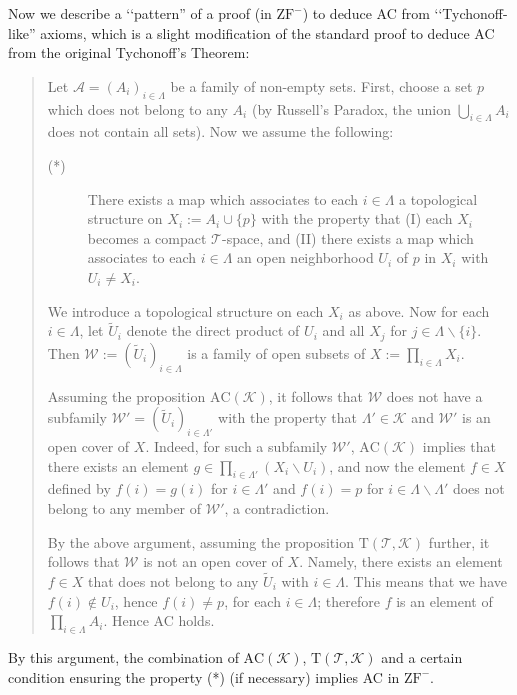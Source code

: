 \documentclass{article}
\begin{document}
Now we describe a \lq\lq pattern'' of a proof (in $\mathrm{ZF}^-$) to deduce AC from \lq\lq Tychonoff-like'' axioms, which is a slight modification of the standard proof to deduce AC from the original Tychonoff's Theorem:
\begin{quotation}
Let $\mathcal{A} = (A_i)_{i \in \Lambda}$ be a family of non-empty sets.
First, choose a set $p$ which does not belong to any $A_i$ (by Russell's Paradox, the union $\bigcup_{i \in \Lambda} A_i$ does not contain all sets).
Now we assume the following:
\begin{description}
\item[(*)] There exists a map which associates to each $i \in \Lambda$ a topological structure on $X_i := A_i \cup \{p\}$ with the property that (I) each $X_i$ becomes a compact $\mathcal{T}$-space, and (II) there exists a map which associates to each $i \in \Lambda$ an open neighborhood $U_i$ of $p$ in $X_i$ with $U_i \neq X_i$.
\end{description}
We introduce a topological structure on each $X_i$ as above.
Now for each $i \in \Lambda$, let $\widetilde{U}_i$ denote the direct product of $U_i$ and all $X_j$ for $j \in \Lambda \smallsetminus \{i\}$.
Then $\mathcal{W} := (\widetilde{U}_i)_{i \in \Lambda}$ is a family of open subsets of $X := \prod_{i \in \Lambda} X_i$.

Assuming the proposition $\mathrm{AC}(\mathcal{K})$, it follows that $\mathcal{W}$ does not have a subfamily $\mathcal{W}' = (\widetilde{U}_i)_{i \in \Lambda'}$ with the property that $\Lambda' \in \mathcal{K}$ and $\mathcal{W}'$ is an open cover of $X$.
Indeed, for such a subfamily $\mathcal{W}'$, $\mathrm{AC}(\mathcal{K})$ implies that there exists an element $g \in \prod_{i \in \Lambda'} (X_i \smallsetminus U_i)$, and now the element $f \in X$ defined by $f(i) = g(i)$ for $i \in \Lambda'$ and $f(i) = p$ for $i \in \Lambda \smallsetminus \Lambda'$ does not belong to any member of $\mathcal{W}'$, a contradiction.

By the above argument, assuming the proposition $\mathrm{T}(\mathcal{T},\mathcal{K})$ further, it follows that $\mathcal{W}$ is not an open cover of $X$.
Namely, there exists an element $f \in X$ that does not belong to any $\widetilde{U}_i$ with $i \in \Lambda$.
This means that we have $f(i) \not\in U_i$, hence $f(i) \neq p$, for each $i \in \Lambda$; therefore $f$ is an element of $\prod_{i \in \Lambda} A_i$.
Hence AC holds.
\end{quotation}
By this argument, the combination of $\mathrm{AC}(\mathcal{K})$, $\mathrm{T}(\mathcal{T},\mathcal{K})$ and a certain condition ensuring the property (*) (if necessary) implies AC in $\mathrm{ZF}^-$.
\end{document}
